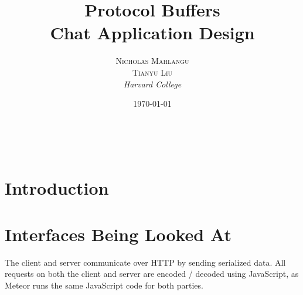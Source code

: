 \documentclass[a4paper, 11pt]{article} %
\title{\textbf{Protocol Buffers}\\ %
Chat Application Design} %
\author{\textsc{Nicholas Mahlangu} %
\\\textsc{Tianyu Liu}
\\{\textit{Harvard College}}} %
\date{\today} %
\makeatletter
\renewcommand{\maketitle}{ %
\begin{flushright} %
{\LARGE\@title} %

\vspace{50pt} %

{\large\@author} %
\\\@date %

\vspace{40pt} %
\end{flushright}
}
\makeatother
\begin{document}
\maketitle %



%
%


\section*{Introduction}

\section*{Interfaces Being Looked At}


The client and server communicate over HTTP by sending serialized data. All requests on both the client and server are encoded / decoded using JavaScript, as Meteor runs the same JavaScript code for both parties. 
\end{document}
